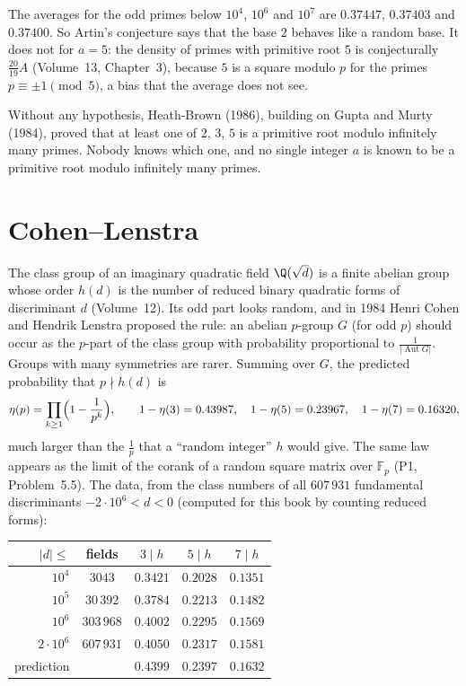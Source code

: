 The averages for the odd primes below $10^4$, $10^6$ and $10^7$ are $0.37447$, $0.37403$ and $0.37400$. So Artin's conjecture says that the base $2$ behaves like a
random base. It does not for $a=5$: the density of primes with primitive root $5$ is conjecturally $\frac{20}{19}A$ (Volume~13, Chapter~3), because $5$ is a square modulo $p$ for
the primes $p\equiv\pm1\pmod5$, a bias that the average does not see.

\begin{remark}\label{conjectures:rem:artinknown}
Without any hypothesis, Heath-Brown (1986), building on Gupta and Murty (1984), proved that at least one of $2$, $3$, $5$ is a primitive root modulo infinitely many
primes. Nobody knows which one, and no single integer $a$ is known to be a primitive root modulo infinitely many primes.
\end{remark}

\section{Cohen--Lenstra}

The class group of an imaginary quadratic field $\Q(\sqrt d)$ is a finite abelian group whose order $h(d)$ is the number of reduced binary quadratic
forms of discriminant $d$ (Volume~12). Its odd part looks random, and in 1984 Henri Cohen and Hendrik Lenstra proposed the rule: an abelian $p$-group $G$ (for odd $p$)
should occur as the $p$-part of the class group with probability proportional to $\frac1{|\operatorname{Aut}G|}$. Groups with many symmetries are rarer.
Summing over $G$, the predicted probability that $p\nmid h(d)$ is
\[
\eta(p)=\prod_{k\ge1}\Bigl(1-\frac1{p^k}\Bigr),\qquad1-\eta(3)=0.43987,\quad1-\eta(5)=0.23967,\quad1-\eta(7)=0.16320,
\]
much larger than the $\frac1p$ that a ``random integer'' $h$ would give. The same law appears as the limit of the corank of a random square matrix over
$\mathbb F_p$ (P1, Problem~5.5). The data, from the class numbers of all $607\,931$ fundamental discriminants $-2\cdot10^6<d<0$ (computed for this book by
counting reduced forms):

\begin{center}
\begin{tabular}{rcccc}
$|d|\le$&fields&$3\mid h$&$5\mid h$&$7\mid h$\\\hline
$10^4$&$3043$&$0.3421$&$0.2028$&$0.1351$\\
$10^5$&$30\,392$&$0.3784$&$0.2213$&$0.1482$\\
$10^6$&$303\,968$&$0.4002$&$0.2295$&$0.1569$\\
$2\cdot10^6$&$607\,931$&$0.4050$&$0.2317$&$0.1581$\\\hline
prediction&&$0.4399$&$0.2397$&$0.1632$
\end{tabular}
\end{center}

